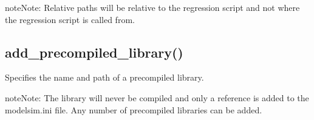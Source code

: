 \documentclass[letterpaper,10pt,english]{sphinxmanual}
\begin{document}
\begin{sphinxVerbatim}[commandchars=\\\{\}]
  \PYG{p}{[}   \PYG{p}{]}

   

  \PYG{p}{[}    \PYG{p}{]}
\end{sphinxVerbatim}

\begin{sphinxadmonition}{note}{Note:}
\sphinxAtStartPar
Relative paths will be relative to the regression script
and not where the regression script is called from.
\end{sphinxadmonition}


\subsection{add\_precompiled\_library()}
\label{\detokenize{api:add-precompiled-library}}
\sphinxAtStartPar
Specifies the name and path of a precompiled library.

\begin{sphinxadmonition}{note}{Note:}
\sphinxAtStartPar
The library will never be compiled and only a reference is added to the modelsim.ini file.
Any number of precompiled libraries can be added.
\end{sphinxadmonition}
\end{document}
